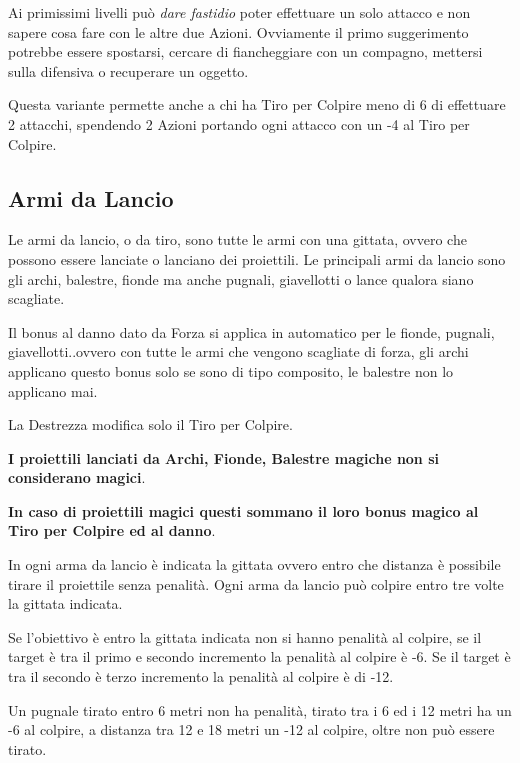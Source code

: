 \begin{multicols}{2}
Ai primissimi livelli può \emph{dare fastidio} poter effettuare un solo attacco e non sapere cosa fare con le altre due Azioni. Ovviamente il primo suggerimento potrebbe essere spostarsi, cercare di fiancheggiare con un compagno, mettersi sulla difensiva o recuperare un oggetto.

Questa variante permette anche a chi ha Tiro per Colpire meno di 6 di effettuare 2 attacchi, spendendo 2 Azioni portando ogni attacco con un -4 al Tiro per Colpire.

%

\subsection{Armi da Lancio}\label{armidatiro}

Le armi da lancio, o da tiro, sono tutte le armi con una gittata, ovvero che possono essere lanciate o lanciano dei proiettili. Le principali armi da lancio sono gli archi, balestre, fionde ma anche pugnali, giavellotti o lance qualora siano scagliate.

Il bonus al danno dato da Forza si applica in automatico per le fionde, pugnali, giavellotti..ovvero con tutte le armi che vengono scagliate di forza, gli archi applicano questo bonus solo se sono di tipo composito, le balestre non lo applicano mai.

La Destrezza modifica solo il Tiro per Colpire.

\textbf{I proiettili lanciati da Archi, Fionde, Balestre magiche non si considerano magici}.

\textbf{In caso di proiettili magici questi sommano il loro bonus magico al Tiro per Colpire ed al danno}.

In ogni arma da lancio è indicata la gittata ovvero entro che distanza è possibile tirare il proiettile senza penalità. Ogni arma da lancio può colpire entro tre volte la gittata indicata.

Se l'obiettivo è entro la gittata indicata non si hanno penalità al colpire, se il target è tra il primo e secondo incremento la penalità al colpire è -6. Se il target è tra il secondo è terzo incremento la penalità al colpire è di -12.

Un pugnale tirato entro 6 metri non ha penalità, tirato tra i 6 ed i 12 metri ha un -6 al colpire, a distanza tra 12 e 18 metri un -12 al colpire, oltre non può essere tirato.


\end{multicols}

